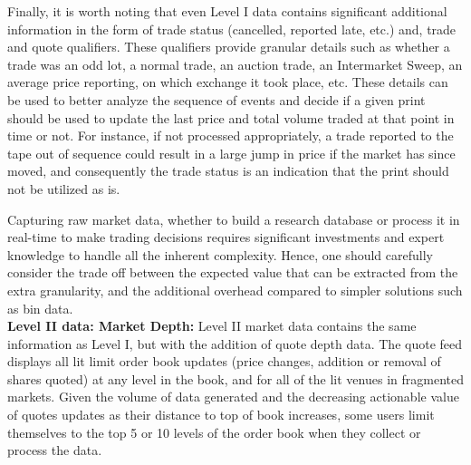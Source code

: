 Finally, it is worth noting that even Level I data contains significant additional information in the form of trade status (cancelled, reported late, etc.) and, trade and quote qualifiers. These qualifiers provide granular details such as whether a trade was an odd lot, a normal trade, an auction trade, an Intermarket Sweep, an average price reporting, on which exchange it took place, etc. These details can be used to better analyze the sequence of events and decide if a given print should be used to update the last price and total volume traded at that point in time or not. For instance, if not processed appropriately, a trade reported to the tape out of sequence could result in a large jump in price if the market has since moved, and consequently the trade status is an indication that the print should not be utilized as is.

Capturing raw market data, whether to build a research database or process it in real-time to make trading decisions requires significant investments and expert knowledge to handle all the inherent complexity. Hence, one should carefully consider the trade off between the expected value that can be extracted from the extra granularity, and the additional overhead compared to simpler solutions such as bin data.\\

\noindent\textbf{Level II data: Market Depth:}  Level II market data contains the same information as Level I, but with the addition of quote depth data. The quote feed displays all lit limit order book updates (price changes, addition or removal of shares quoted) at any level in the book, and for all of the lit venues in fragmented markets. Given the volume of data generated and the decreasing actionable value of quotes updates as their distance to top of book increases, some users limit themselves to the top 5 or 10 levels of the order book  when they collect or process the data.\\


